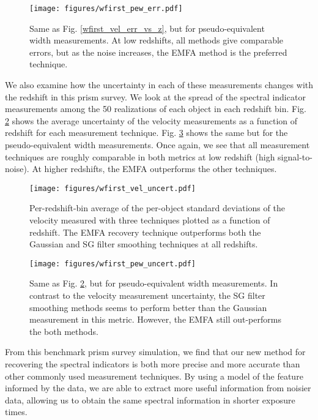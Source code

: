\begin{figure}[!htb]
    \centering
    \texttt{[image: figures/wfirst\_pew\_err.pdf]}
    \caption{Same as Fig. \ref{wfirst_vel_err_vs_z}, but for pseudo-equivalent width measurements. At low redshifts, all methods give comparable errors, but as the noise increases, the EMFA method is the preferred technique.}
    \label{wfirst_ew_err_vs_z}
\end{figure}

We also examine how the uncertainty in each of these measurements changes with the redshift in this prism survey. We look at the spread of the spectral indicator measurements among the 50 realizations of each object in each redshift bin. Fig. \ref{wfirst_vel_uncertainty_vs_z} shows the average uncertainty of the velocity measurements as a function of redshift for each measurement technique. Fig. \ref{wfirst_ew_uncertainty_vs_z} shows the same but for the pseudo-equivalent width measurements. Once again, we see that all measurement techniques are roughly comparable in both metrics at low redshift (high signal-to-noise). At higher redshifts, the EMFA outperforms the other techniques.

\begin{figure}[!htb]
    \centering
    \texttt{[image: figures/wfirst\_vel\_uncert.pdf]}
    \caption{Per-redshift-bin average of the per-object standard deviations of the velocity measured with three techniques plotted as a function of redshift. The EMFA recovery technique outperforms both the Gaussian and SG filter smoothing techniques at all redshifts.}
    \label{wfirst_vel_uncertainty_vs_z}
\end{figure}

\begin{figure}[!htb]
    \centering
    \texttt{[image: figures/wfirst\_pew\_uncert.pdf]}
    \caption{Same as Fig. \ref{wfirst_vel_uncertainty_vs_z}, but for pseudo-equivalent width measurements. In contrast to the velocity measurement uncertainty, the SG filter smoothing methods seems to perform better than the Gaussian measurement in this metric. However, the EMFA still out-performs the both methods.}
    \label{wfirst_ew_uncertainty_vs_z}
\end{figure}

From this benchmark prism survey simulation, we find that our new method for recovering the \siliconii\; spectral indicators is both more precise and more accurate than other commonly used measurement techniques. By using a model of the feature informed by the data, we are able to extract more useful information from noisier data, allowing us to obtain the same spectral information in shorter exposure times. 

